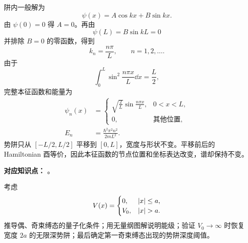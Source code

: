 \begin{checkedsolution}
阱内一般解为
\begin{equation}
  \psi(x)=A\cos kx+B\sin kx.
  \label{eq:QM-C05-S02-E05-general-solution}
\end{equation}
由 $\psi(0)=0$ 得 $A=0$。再由
\begin{equation}
  \psi(L)=B\sin kL=0
  \label{eq:QM-C05-S02-E05-second-boundary}
\end{equation}
并排除 $B=0$ 的零函数，得到
\begin{equation}
  k_n=\frac{n\pi}{L},
  \qquad n=1,2,\ldots.
  \label{eq:QM-C05-S02-E05-wave-numbers}
\end{equation}
由于
\begin{equation}
  \int_0^L\sin^2\frac{n\pi x}{L}\dd x=\frac L2,
  \label{eq:QM-C05-S02-E05-normalization-integral}
\end{equation}
完整本征函数和能量为
\begin{align}
  \psi_n(x)
  &=\begin{cases}
    \displaystyle\sqrt{\frac2L}\sin\frac{n\pi x}{L},&0<x<L,\\[5pt]
    0,&\text{其他位置},
  \end{cases}
  \label{eq:QM-C05-S02-E05-eigenfunction}\\
  E_n
  &=\boxed{\frac{\hbar^2\pi^2n^2}{2mL^2}}.
  \label{eq:QM-C05-S02-E05-energy}
\end{align}
势阱只从 $[-L/2,L/2]$ 平移到 $[0,L]$，宽度与形状不变。平移前后的 Hamiltonian 酉等价，因此本征函数的节点位置和坐标表达改变，谱却保持不变。
\end{checkedsolution}


\textbf{对应知识点：}
。

考虑
\begin{equation}
  V(x)=
  \begin{cases}
    0,&\abs x\leq a,\\
    V_0,&\abs x>a.
  \end{cases}
  \label{eq:QM-C05-S02-E06-potential}
\end{equation}
推导偶、奇束缚态的量子化条件；用无量纲图解说明能级；验证 $V_0\to\infty$ 时恢复宽度 $2a$ 的无限深势阱；最后确定第一奇束缚态出现的势阱深度阈值。

